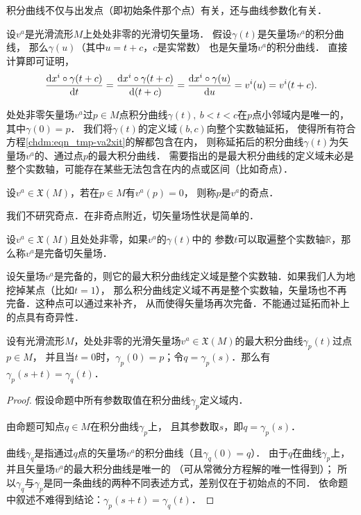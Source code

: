 积分曲线不仅与出发点（即初始条件那个点）有关，还与曲线参数化有关．
\begin{example}
    设$v^a$是光滑流形$M$上处处非零的光滑切矢量场．
    假设$\gamma(t)$是矢量场$v^a$的积分曲线，
    那么$\gamma(u)$（其中$u=t+c$，$c$是实常数）
    也是矢量场$v^a$的积分曲线．
直接计算即可证明，
    \begin{equation}
        \frac{{\rm d} x^i\circ\gamma(t+c)}{{\rm d} t} = 
        \frac{{\rm d} x^i\circ\gamma(t+c)}{{\rm d} (t+c)}=
        \frac{{\rm d} x^i\circ\gamma(u)}{{\rm d} u}=v^i(u)=v^i(t+c).
    \end{equation}
\end{example}

处处非零矢量场$v^a$过$p\in M$点积分曲线$\gamma(t),\ b<t<c$在$p$点小邻域内是唯一的，其中$\gamma(0)=p$．
我们将$\gamma(t)$的定义域$(b,c)$向整个实数轴延拓，
使得所有符合方程\eqref{chdm:eqn_tmp-va2xit}的解都包含在内，
则称延拓后的积分曲线$\gamma(t)$为矢量场$v^a$的、通过点$p$的{\heiti 最大积分曲线}．
需要指出的是最大积分曲线的定义域未必是整个实数轴，可能存在某些无法包含在内的点或区间（比如奇点）．

\begin{definition}
    设$v^a \in \mathfrak{X}(M)$，若在$p\in M$有$v^a(p)=0$，
    则称$p$是$v^a$的{\heiti 奇点}．
\end{definition}
我们不研究奇点．在非奇点附近，切矢量场性状是简单的．


\begin{definition}\label{chdm:def_vector-complete}
    设$v^a \in \mathfrak{X}(M)$且处处非零，如果$v^a$的$\gamma(t)$中的
    参数$t$可以取遍整个实数轴$\mathbb{R}$，那么称$v^a$是{\heiti 完备}切矢量场．
\end{definition}

设矢量场$v^a$是完备的，则它的最大积分曲线定义域是整个实数轴．如果我们人为地挖掉某点（比如$t=1$），
那么积分曲线定义域不再是整个实数轴，矢量场也不再完备．这种点可以通过来补齐，
从而使得矢量场再次完备．不能通过延拓而补上的点具有奇异性．

\begin{proposition}\label{chdm:thm_st}
    设有光滑流形$M$，处处非零的光滑矢量场$v^a\in \mathfrak{X}(M)$的最大积分曲线$\gamma_p(t)$过点$p \in M$，
    并且当$t=0$时，$\gamma_p(0)=p$；令$q=\gamma_p(s)$．那么有$\gamma_p(s+t)=\gamma_q(t)$．
\end{proposition}
\begin{proof}
    假设命题中所有参数取值在积分曲线$\gamma_p$定义域内．
    
    由命题可知点$q\in M$在积分曲线$\gamma_p$上，
    且其参数取$s$，即$q=\gamma_p(s)$．
    
    曲线$\gamma_q$是指通过$q$点的矢量场$v^a$的积分曲线（且$\gamma_q(0)=q$）．
    由于$q$在曲线$\gamma_p$上，并且矢量场$v^a$的最大积分曲线是唯一的
    （可从常微分方程解的唯一性得到）；
    所以$\gamma_q$与$\gamma_p$是同一条曲线的两种不同表述方式，差别仅在于初始点的不同．
    依命题中叙述不难得到结论：$\gamma_p(s+t)=\gamma_q(t)$．
\end{proof}

